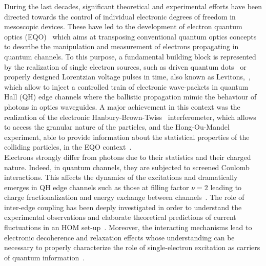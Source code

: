 \documentclass[12pt]{iopart}
\begin{document}
During the last decades, significant theoretical and experimental efforts have been directed towards the control of individual electronic degrees of freedom in mesoscopic devices. These have led to the development of electron quantum optics (EQO)~\cite{Grenier11, Bocquillon14, Roussel17, Ferraro17b, Glattli17, Bauerle18} which aims at transposing conventional quantum optics concepts to describe the manipulation and measurement of electrons propagating in quantum channels. To this purpose, a fundamental building block is represented by the realization of single electron sources, such as driven quantum dots~\cite{Feve07, Mahe10} or properly designed Lorentzian voltage pulses in time, also known as Levitons,~\cite{Dubois13b, Jullien14}, which allow to inject a controlled train of electronic wave-packets in quantum Hall (QH) edge channels where the ballistic propagation mimic the behaviour of photons in optics waveguides. A major achievement in this context was the realization of the electronic Hanbury-Brown-Twiss~\cite{Hanbury56} interferometer, which allows to access the granular nature of the particles, and the Hong-Ou-Mandel~\cite{Hong87} experiment, able to provide information about the statistical properties of the colliding particles, in the EQO context~\cite{Bocquillon12, Bocquillon13, Wahl14, Ferraro14, Freulon15, Marguerite16}.\\
Electrons strongly differ from photons due to their statistics and their charged nature. Indeed, in quantum channels, they are subjected to screened Coulomb interactions. This affects the dynamics of the excitations and dramatically emerges in QH edge channels such as those at filling factor $\nu=2$ leading to charge fractionalization and energy exchange between channels~\cite{Levkivskyi08, Altimiras09, Lunde10, Levkivskyi12}. The role of inter-edge coupling has been deeply investigated in order to understand the experimental observations and elaborate theoretical predictions of current fluctuations in an HOM set-up~\cite{Bocquillon13, Wahl14, Marguerite16, Rebora20}. Moreover, the interacting mechanisms lead to electronic decoherence and relaxation effects whose understanding can be necessary to properly characterize the role of single-electron excitation as carriers of quantum information~\cite{Gasse13, Rodriguez20, Rebora21}. \\
\end{document}
